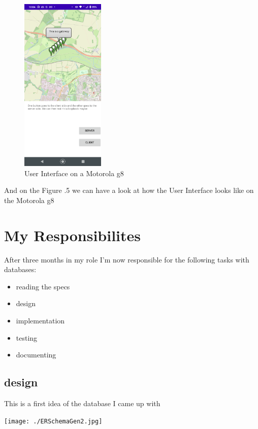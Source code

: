 \documentclass[a4paper,12pt]{article}
\begin{document}
\begin{figure}
\includegraphics[width=4cm]{./current_status_g8.PNG}
\caption{User Interface on a Motorola g8}\label{wrap-fig:5}
\end{figure}


And on the Figure .5 we can have a look at how the User Interface looks like on the Motorola g8









\section{My Responsibilites}

After three months in my role I'm now responsible for the following tasks with databases:

\begin{itemize}
\item {reading the specs}
\item design
\item implementation
\item testing 
\item documenting
\end{itemize}

\clearpage

\subsection{design}
This is a first idea of the database I came up with

\noindent \texttt{[image: ./ERSchemaGen2.jpg]}
\end{document}
